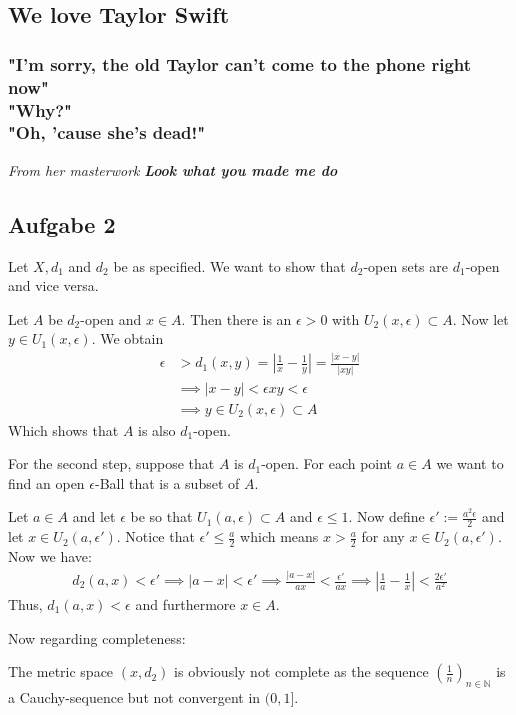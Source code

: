 \documentclass[a4paper]{article}
\renewcommand{\hline}{\noindent\makebox[\linewidth]{\rule{12cm}{1pt}}}
\newcommand{\vip}[1]{\textit{\textbf{#1}}}
\begin{document}
\hline

\subsection*{We love Taylor Swift}
\subsubsection*{"I'm sorry, the old Taylor can't come to the phone right now"\\
"Why?"\\
"Oh, 'cause she's dead!"}
{\color{grey}\emph{From her masterwork }\vip{Look what you made me do}}

\hline 

\subsection*{Aufgabe 2}
Let $X, d_1$ and $d_2$ be as specified. We want to show that $d_2$-open sets are $d_1$-open and vice versa.

Let $A$ be $d_2$-open and $x \in A$. Then there is an $\epsilon > 0$ with $U_2(x,\epsilon)\subset A$. Now let $y\in U_1(x,\epsilon)$. We obtain
\begin{align*}
    \epsilon &> d_1(x,y) = |\frac{1}{x}-\frac{1}{y}| = \frac{|x-y|}{|xy|}\\
    &\implies |x-y|<\epsilon xy < \epsilon\\
    &\implies y\in U_2(x,\epsilon)\subset A
\end{align*}
Which shows that $A$ is also $d_1$-open.

For the second step, suppose that $A$ is $d_1$-open. For each point $a\in A$ we want to find an open $\epsilon$-Ball that is a subset of $A$.

Let $a\in A$ and let $\epsilon$ be so that $U_1(a,\epsilon) \subset A$ and $\epsilon\leq 1$. Now define $\epsilon' := \frac{a^2 \epsilon}{2}$ and let $x\in U_2(a,\epsilon')$. Notice that $\epsilon'\leq \frac{a}{2}$ which means $x>\frac{a}{2}$ for any $x\in U_2(a,\epsilon')$. Now we have:
\begin{align*}
    d_2(a,x)<\epsilon' \implies |a-x|<\epsilon' \implies \frac{|a-x|}{ax}<\frac{\epsilon'}{ax} \implies |\frac{1}{a}-\frac{1}{x}|<\frac{2\epsilon'}{a^2}
\end{align*}
Thus, $d_1(a,x) < \epsilon$ and furthermore $x\in A$.

Now regarding completeness:

The metric space $(x,d_2)$ is obviously not complete as the sequence $(\frac{1}{n})_{n\in\mathbb N}$ is a Cauchy-sequence but not convergent in $(0,1]$.
\end{document}
